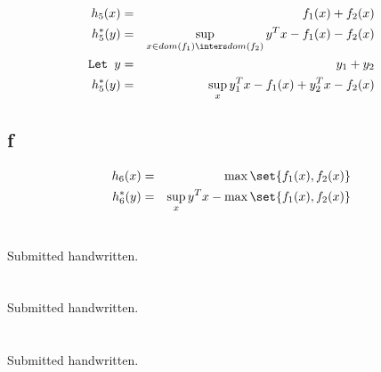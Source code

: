 \documentclass{article}
\begin{document}
\begin{eqnarray*}
h_5(x) &=& f_1(x) + f_2(x)\\
h_5^{*}(y) &=& \sup_{x \in dom(f_1) \inters dom(f_2)}y^{T}x - f_1(x) - f_2(x)\\
\texttt{Let }y &=& y_1 + y_2\\
h_5^{*}(y) &=& \sup_{x}y_1^{T}x - f_1(x) + y_2^{T}x - f_2(x)\\
\end{eqnarray*}
\tbc

\subsection{f}
\begin{eqnarray*}
h_6(x) &=& \max \set{f_1(x), f_2(x)}\\
h_6^{*}(y) &=& \sup_{x}y^{T}x - \max \set{f_1(x), f_2(x)}\\
\end{eqnarray*}
\tbc


\section{}
Submitted handwritten.

\section{}
Submitted handwritten.

\section{}
Submitted handwritten.



% 
% 
\end{document}

